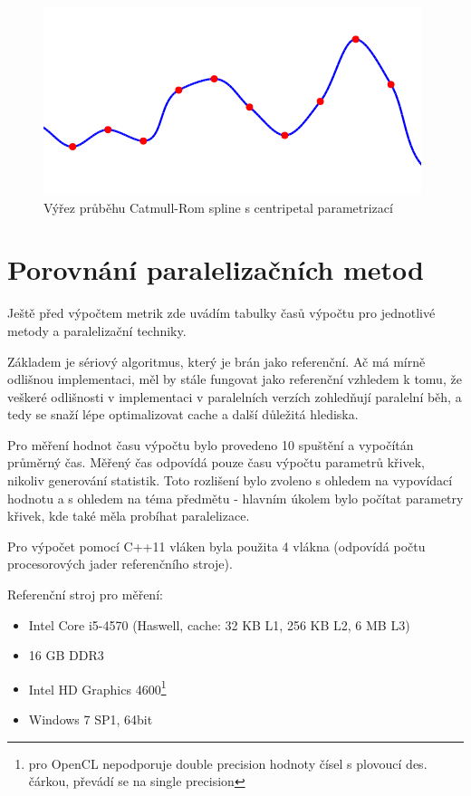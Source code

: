 \documentclass[]{thesiskiv}
\begin{document}
\begin{figure}
\begin{minipage}[ht]{0.65\textwidth}
	\includegraphics[width=\linewidth]{img/sample-catmullrom.png}
	\caption{Výřez průběhu Catmull-Rom spline s centripetal parametrizací}\label{obr:catmullromfinal}
\end{minipage}

\end{figure}

\section{Porovnání paralelizačních metod}

Ještě před výpočtem metrik zde uvádím tabulky časů výpočtu pro jednotlivé metody a paralelizační techniky.

Základem je sériový algoritmus, který je brán jako referenční. Ač má mírně odlišnou implementaci, měl by stále fungovat jako referenční vzhledem k tomu, že veškeré odlišnosti v implementaci v paralelních verzích zohledňují paralelní běh, a tedy se snaží lépe optimalizovat cache a další důležitá hlediska.

Pro měření hodnot času výpočtu bylo provedeno 10 spuštění a vypočítán průměrný čas. Měřený čas odpovídá pouze času výpočtu parametrů křivek, nikoliv generování statistik. Toto rozlišení bylo zvoleno s ohledem na vypovídací hodnotu a s ohledem na téma předmětu - hlavním úkolem bylo počítat parametry křivek, kde také měla probíhat paralelizace.

Pro výpočet pomocí C++11 vláken byla použita 4 vlákna (odpovídá počtu procesorových jader referenčního stroje).

Referenční stroj pro měření:
\begin{itemize}[noitemsep]
	\item Intel Core i5-4570 (Haswell, cache: 32 KB L1, 256 KB L2, 6 MB L3)
	\item 16 GB DDR3
	\item Intel HD Graphics 4600\footnote{pro OpenCL nepodporuje double precision hodnoty čísel s plovoucí des. čárkou, převádí se na single precision}
	\item Windows 7 SP1, 64bit
\end{itemize}
\end{document}

